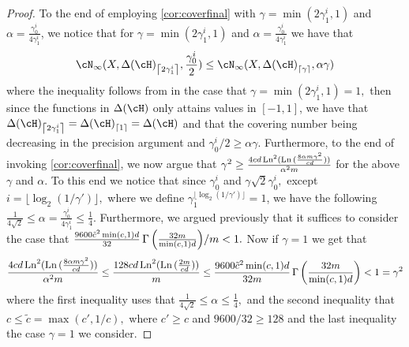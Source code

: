 \begin{proof}
    To the end of employing \cref{cor:coverfinal} with $\gamma= \min(2\gamma_{1}^{i},1) $ and $ \alpha=\frac{\gamma_{0}^{i}}{4\gamma_{1}^{i}}$, we notice that for $\gamma= \min(2\gamma_{1}^{i},1) $ and $ \alpha=\frac{\gamma_{0}^{i}}{4\gamma_{1}^{i}}$ we have that 
    \begin{align}\label{eq:finalbound-4}
        \cN_{\infty}(X,\dlh_{\left\lceil2\gamma_{1}^{i}\right\rceil},\frac{\gamma_{0}^{i}}{2})\leq\cN_{\infty}(X,\dlh_{\left\lceil\gamma\right\rceil},\alpha \gamma)  
    \end{align}
    where the inequality follows from in the case that $
    \gamma=\min(2\gamma_{1}^{i},1)=1,$ then since the functions in $ \dlh $ only attains values in $
    [-1,1]$, we have that  $
    \dlh_{\left\lceil2\gamma_{1}^{i}\right\rceil}=\dlh_{\left\lceil1\right\rceil}
    =\dlh$ and that the covering number being decreasing in the precision argument and $ \gamma_{0}^{i}/2\geq \alpha\gamma $.
    Furthermore, to the end of invoking \cref{cor:coverfinal}, we now argue that $ \gamma^{2}\geq \frac{4cd\operatorname{\mathrm{Ln}}^{2}(\operatorname{\mathrm{Ln}}{ ( \frac{8\alpha m \gamma^{2}}{cd}) }) }{\alpha^{2}m}$ for the above $ \gamma$ and $ \alpha .$  To this end we notice that since $ \gamma_{0}^{i} $ and $ \gamma\sqrt{2}\gamma_{0}^{i},$ except $ i=\lfloor\log_{2}(  1/\gamma')\rfloor,$ where we define $ \gamma_{1}^{\lfloor\log_{2}(  1/\gamma')\rfloor}=1$, we have the following $ \frac{1}{4\sqrt{2}}\leq \alpha=\frac{\gamma_{0}^{i}}{4\gamma_{1}^{i}} \leq \frac{1}{4}.$ Furthermore, we argued previously that it suffices to consider the case that $\frac{9600\tilde{c}^2 \min(c,1)d}{32} \operatorname{\Gamma}{\left(  \frac{32 m }{\min(c,1)d} \right)}/{m}<1.$ Now if $ \gamma=1 $ we get that 
    \begin{align*}
      \frac{4cd\operatorname{\mathrm{Ln}}^{2}(\operatorname{\mathrm{Ln}}{ ( \frac{8\alpha m \gamma^{2}}{cd}) }) }{\alpha^{2}m}\leq \frac{128cd\operatorname{\mathrm{Ln}}^{2}(\operatorname{\mathrm{Ln}}{ ( \frac{2 m}{cd}) }) }{m} \leq \frac{9600\tilde{c}^2 \min(c,1)d}{32m} \operatorname{\Gamma}{\left(  \frac{32 m }{\min(c,1)d} \right)} <1=\gamma^{2}
    \end{align*}
    where the first inequality uses that $ \frac{1}{4\sqrt{2}}\leq \alpha \leq \frac{1}{4},$ and the second inequality that $ c\leq \tilde{c}=\max(c',1/c),$ where $ c'\geq c $  and $ 9600/32 \geq128$ and the last inequality the case $ \gamma=1 $  we consider. 
    

\end{proof}
